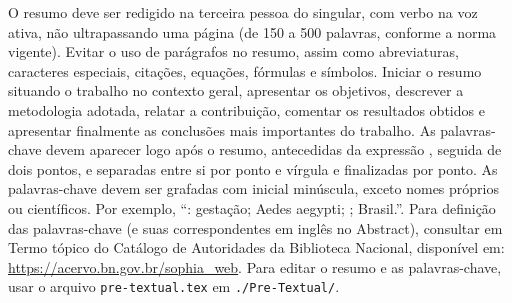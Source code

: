 % 

% 

\begin{Abstract}%
[brazilian]%
O resumo deve ser redigido na terceira pessoa do singular, com verbo na voz ativa, não ultrapassando uma página (de 150 a 500 palavras, conforme a norma vigente).
Evitar o uso de parágrafos no resumo, assim como abreviaturas, caracteres especiais, citações, equações, fórmulas e símbolos.
Iniciar o resumo situando o trabalho no contexto geral, apresentar os objetivos, descrever a metodologia adotada, relatar a contribuição, comentar os resultados obtidos e apresentar finalmente as conclusões mais importantes do trabalho.
As palavras-chave devem aparecer logo após o resumo, antecedidas da expressão \KeywordsCall, seguida de dois pontos, e separadas entre si por ponto e vírgula e finalizadas por ponto.
As palavras-chave devem ser grafadas com inicial minúscula, exceto nomes próprios ou científicos.
Por exemplo, \enquote{\KeywordsCall: gestação; Aedes aegypti; ; Brasil.}.
Para definição das palavras-chave (e suas correspondentes em inglês no Abstract), consultar em Termo tópico do Catálogo de Autoridades da Biblioteca Nacional, disponível em: \url{https://acervo.bn.gov.br/sophia_web}.
Para editar o resumo e as palavras-chave, usar o arquivo \texttt{pre-textual.tex} em \texttt{./Pre-Textual/}.
\end{Abstract}
